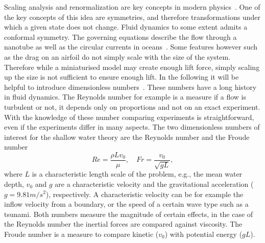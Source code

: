 Scaling analysis and renormalization are key concepts in modern physics~\cite{yakhotRenormalizationGroupAnalysis1986, IntroductionQuantumField2018}.
One of the key concepts of this idea are symmetries, and therefore transformations under which a given state does not change.
Fluid dynamics to some extent admits a conformal symmetry.
The governing equations describe the flow through a nanotube as well as the circular currents in oceans~\cite{secchiMassiveRadiusdependentFlow2016, marcheDerivationNewTwodimensional2007}.
Some features however such as the drag on an airfoil do not simply scale with the size of the system.
Therefore while a miniaturised model may create enough lift force, simply scaling up the size is not sufficient to ensure enough lift.  
In the following it will be helpful to introduce dimensionless numbers~\cite{ruzickaDimensionlessNumbers2008,neversFluidMechanicsChemical2019}.
These numbers have a long history in fluid dynamics.
The Reynolds number for example is a measure if a flow is turbulent or not, it depends only on proportions and not on an exact experiment.
With the knowledge of these number comparing experiments is straightforward, even if the experiments differ in many aspects.
The two dimensionless numbers of interest for the shallow water theory are the Reynolds number and the Froude number
\begin{equation}\label{eq:Re_and_Fr}
    Re = \frac{\rho L v_0}{\mu},\quad Fr = \frac{v_0}{\sqrt{g L}},
\end{equation}
where $L$ is a characteristic length scale of the problem, e.g., the mean water depth, $v_0$ and $g$ are a characteristic velocity and the gravitational acceleration ($g = 9.81 m/s^2$), respectively.
A characteristic velocity can be for example the inflow velocity from a boundary, or the speed of a certain wave type such as a tsunami.
Both numbers measure the magnitude of certain effects, in the case of the Reynolds number the inertial forces are compared against viscosity.
The Froude number is a measure to compare kinetic ($v_0$) with potential energy ($g L$).

